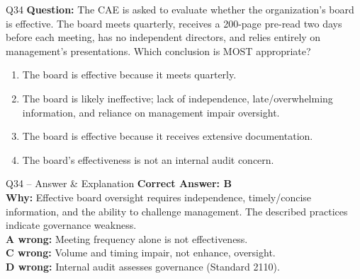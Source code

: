 \documentclass[aspectratio=169,10pt]{beamer}
\begin{document}
	\begin{frame}[t]{Q34}
		\small
		\textbf{Question:} The CAE is asked to evaluate whether the organization's board is effective. The board meets quarterly, receives a 200-page pre-read two days before each meeting, has no independent directors, and relies entirely on management's presentations. Which conclusion is MOST appropriate?
		\begin{enumerate}[label=\Alph*.,itemsep=1pt,topsep=2pt]
			\item The board is effective because it meets quarterly.
			\item The board is likely ineffective; lack of independence, late/overwhelming information, and reliance on management impair oversight.
			\item The board is effective because it receives extensive documentation.
			\item The board's effectiveness is not an internal audit concern.
		\end{enumerate}
	\end{frame}
	
	\begin{frame}[t]{Q34 -- Answer \& Explanation}
		\small
		\textbf{Correct Answer: B} \\[4pt]
		\textbf{Why:} Effective board oversight requires independence, timely/concise information, and the ability to challenge management. The described practices indicate governance weakness. \\[4pt]
		\textbf{A wrong:} Meeting frequency alone is not effectiveness. \\[2pt]
		\textbf{C wrong:} Volume and timing impair, not enhance, oversight. \\[2pt]
		\textbf{D wrong:} Internal audit assesses governance (Standard 2110).
	\end{frame}
	
\end{document}
